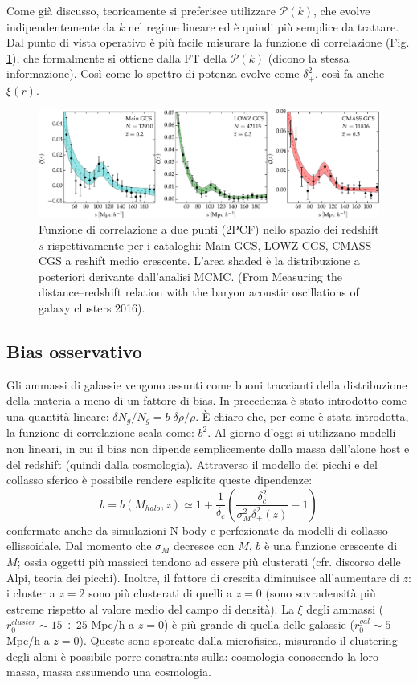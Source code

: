 Come già discusso, teoricamente si preferisce utilizzare $\mathcal{P}(k)$, che evolve indipendentemente da $k$ nel regime lineare ed è quindi più semplice da trattare. Dal punto di vista operativo è più facile misurare la funzione di correlazione (Fig. \ref{fig10:2pcf}), che formalmente si ottiene dalla FT della $\mathcal{P}(k)$ (dicono la stessa informazione). Così come lo spettro di potenza evolve come $\delta_+^2$, così fa anche $\xi(r)$.

\begin{figure}[H]
    \centering
    \includegraphics[width=.95 \textwidth]{Pictures/10/2pcf.eps}
    \caption{Funzione di correlazione a due punti (2PCF) nello spazio dei redshift $s$ rispettivamente per i cataloghi: Main-GCS, LOWZ-CGS, CMASS-CGS a reshift medio crescente. L'area shaded è la distribuzione a posteriori derivante dall'analisi MCMC. (From Measuring the distance–redshift relation with the baryon acoustic oscillations of galaxy clusters 2016).}\label{fig10:2pcf}
\end{figure}

\subsection{Bias osservativo}
Gli ammassi di galassie vengono assunti come buoni traccianti della distribuzione della materia a meno di un fattore di bias. In precedenza è stato introdotto come una quantità lineare: $\delta N_g / N_g = b\;  \delta \rho/ \rho$. È chiaro che, per come è stata introdotta, la funzione di correlazione scala come: $b^2$. Al giorno d'oggi si utilizzano modelli non lineari, in cui il bias non dipende semplicemente dalla massa dell'alone host e del redshift (quindi dalla cosmologia). Attraverso il modello dei picchi e del collasso sferico è possibile rendere esplicite queste dipendenze:
\begin{equation}
    b=b(M_{halo}, z) \simeq 1 + \frac{1}{\delta_c} \left(\frac{\delta_c^2}{\sigma_M^2\delta_+^2(z)}-1\right)
\end{equation}
confermate anche da simulazioni N-body e perfezionate da modelli di collasso ellissoidale. Dal momento che $\sigma_M$ decresce con $M$, $b$ è una funzione crescente di $M$; ossia oggetti più massicci tendono ad essere più clusterati (cfr. discorso delle Alpi, teoria dei picchi). Inoltre, il fattore di crescita diminuisce all'aumentare di $z$: i cluster a $z=2$ sono più clusterati di quelli a $z=0$ (sono sovradensità più estreme rispetto al valore medio del campo di densità). La $\xi$ degli ammassi ($r_0^{cluster} \sim 15\div 25$ Mpc/h a $z=0$) è più grande di quella delle galassie ($r_0^{gal} \sim 5$ Mpc/h a $z=0$). Queste sono sporcate dalla microfisica, misurando il clustering degli aloni è possibile porre constraints sulla: cosmologia conoscendo la loro massa, massa assumendo una cosmologia.

